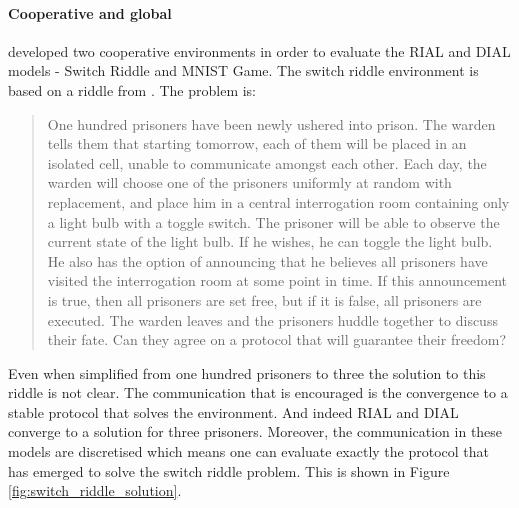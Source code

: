 \documentclass{article}
\begin{document}
\paragraph{Cooperative and global} \citet{foerster2016learning} developed two cooperative environments in order to evaluate the RIAL and DIAL models - Switch Riddle and MNIST Game. The switch riddle environment is based on a riddle from \citet{wu2002prisoners}. The problem is:

\begin{quote}
One hundred prisoners have been newly ushered into prison. The warden tells them that starting tomorrow, each of them will be placed in an isolated cell, unable to communicate amongst each other. Each day, the warden will choose one of the prisoners uniformly at random with replacement, and place him in a central interrogation room containing only a light bulb with a toggle switch. The prisoner will be able to observe the current state of the light bulb. If he wishes, he can toggle the light bulb. He also has the option of announcing that he believes all prisoners have visited the interrogation room at some point in time. If this announcement is true, then all prisoners are set free, but if it is false, all prisoners are executed. The warden leaves and the prisoners huddle together to discuss their fate. Can they agree on a protocol that will guarantee their freedom?
\end{quote}

Even when simplified from one hundred prisoners to three the solution to this riddle is not clear. The communication that is encouraged is the convergence to a stable protocol that solves the environment. And indeed RIAL and DIAL converge to a solution for three prisoners. Moreover, the communication in these models are discretised which means one can evaluate exactly the protocol that has emerged to solve the switch riddle problem. This is shown in Figure \ref{fig:switch_riddle_solution}.

\
\end{document}
